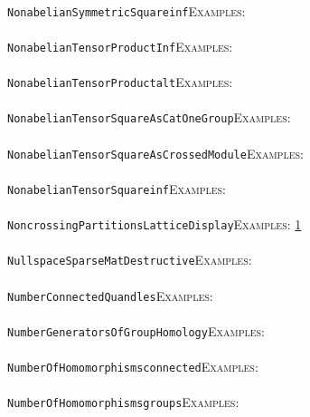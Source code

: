 \documentclass[a4paper,11pt]{report}
\begin{document}
{{ \\
 \texttt{NonabelianSymmetricSquare{\textunderscore}inf}{\nobreakspace}{\nobreakspace}{\nobreakspace}{\nobreakspace}\textsc{Examples:} \\
 \\
 \texttt{NonabelianTensorProduct{\textunderscore}Inf}{\nobreakspace}{\nobreakspace}{\nobreakspace}{\nobreakspace}\textsc{Examples:} \\
 \\
 \texttt{NonabelianTensorProduct{\textunderscore}alt}{\nobreakspace}{\nobreakspace}{\nobreakspace}{\nobreakspace}\textsc{Examples:} \\
 \\
 \texttt{NonabelianTensorSquareAsCatOneGroup}{\nobreakspace}{\nobreakspace}{\nobreakspace}{\nobreakspace}\textsc{Examples:} \\
 \\
 \texttt{NonabelianTensorSquareAsCrossedModule}{\nobreakspace}{\nobreakspace}{\nobreakspace}{\nobreakspace}\textsc{Examples:} \\
 \\
 \texttt{NonabelianTensorSquare{\textunderscore}inf}{\nobreakspace}{\nobreakspace}{\nobreakspace}{\nobreakspace}\textsc{Examples:} \\
 \\
 \texttt{NoncrossingPartitionsLatticeDisplay}{\nobreakspace}{\nobreakspace}{\nobreakspace}{\nobreakspace}\textsc{Examples:} \href{../www/SideLinks/About/aboutNoncrossing.html} {1}{\nobreakspace} \\
 \\
 \texttt{NullspaceSparseMatDestructive}{\nobreakspace}{\nobreakspace}{\nobreakspace}{\nobreakspace}\textsc{Examples:} \\
 \\
 \texttt{NumberConnectedQuandles}{\nobreakspace}{\nobreakspace}{\nobreakspace}{\nobreakspace}\textsc{Examples:} \\
 \\
 \texttt{NumberGeneratorsOfGroupHomology}{\nobreakspace}{\nobreakspace}{\nobreakspace}{\nobreakspace}\textsc{Examples:} \\
 \\
 \texttt{NumberOfHomomorphisms{\textunderscore}connected}{\nobreakspace}{\nobreakspace}{\nobreakspace}{\nobreakspace}\textsc{Examples:} \\
 \\
 \texttt{NumberOfHomomorphisms{\textunderscore}groups}{\nobreakspace}{\nobreakspace}{\nobreakspace}{\nobreakspace}\textsc{Examples:} \\
}}
\end{document}

